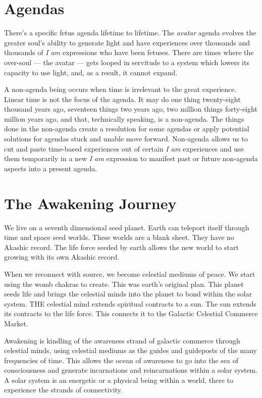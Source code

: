 \documentclass[letterpaper,9pt,twoside,titlepage,onecolumn,openany]{book}
\begin{document}
\section*{Agendas}\label{agendas}

There's a specific fetus agenda lifetime to lifetime. The \emph{avatar}
agenda evolves the greater soul's ability to generate light and have
experiences over thousands and thousands of \emph{I am} expressions who
have been fetuses. There are times where the over-soul --- the avatar
--- gets looped in servitude to a system which lowers its capacity to
use light, and, as a result, it cannot expand.

A non-agenda being occurs when time is irrelevant to the great
experience. Linear time is not the focus of the agenda. It may do one
thing twenty-eight thousand years ago, seventeen things two years ago,
two million things forty-eight million years ago, and that, technically
speaking, is a non-agenda. The things done in the non-agenda create a
resolution for some agendas or apply potential solutions for agendas
stuck and unable move forward. Non-agenda allows us to cut and paste
time-based experiences out of certain \emph{I am} experiences and use
them temporarily in a new \emph{I am} expression to manifest past or
future non-agenda aspects into a present agenda.

\section*{The Awakening Journey}\label{the-awakening-journey}

We live on a seventh dimensional seed planet. Earth can teleport itself
through time and space seed worlds. These worlds are a blank sheet. They
have no Akashic record. The life force seeded by earth allows the new
world to start growing with its own Akashic record.

When we reconnect with source, we become celestial mediums of peace. We
start using the womb chakras to create. This was earth's original plan.
This planet seeds life and brings the celestial minds into the planet to
bond within the solar system. THE celestial mind extends spiritual
contracts to a sun. The sun extends its contracts to the life force.
This connects it to the Galactic Celestial Commerce Market.

Awakening is kindling of the awareness strand of galactic commerce
through celestial minds, using celestial mediums as the guides and
guideposts of the many frequencies of time. This allows the ocean of
awareness to go into the sea of consciousness and generate incarnations
and reincarnations within a solar system. A solar system is an energetic
or a physical being within a world, there to experience the strands of
connectivity.
\end{document}
